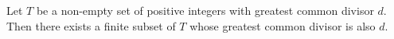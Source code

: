 Let $T$ be a non-empty set of positive integers with greatest common divisor $d$. Then there exists a finite subset of $T$ whose greatest common divisor is also $d$.
